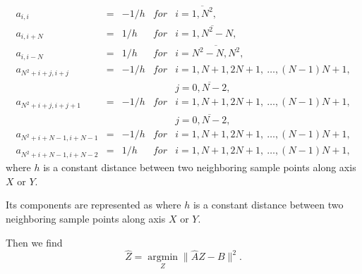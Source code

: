 \documentclass{beamer}
\begin{document}
\begin{frame}[c,allowframebreaks]
    \framebreak

    \small
    \begin{equation*}
        \begin{array}{lllll}
            a_{i,i}             & = &-1/h & for & i = \overline{1,N^2},                         \\
            a_{i,i+N}           & = &1/h  & for & i = \overline{1,N^2 - N},                     \\
            a_{i,i-N}           & = &1/h  & for & i = \overline{N^2 - N,N^2 },                  \\
            a_{N^2+i+j, i+j}    & = &-1/h & for & i = 1, N+1, 2N+1,~\dots, (N-1)N + 1,          \\
                                &   &       &   & j = \overline{0,N-2},                         \\
            a_{N^2+i+j, i+j+1}  & = &-1/h & for & i = 1, N+1, 2N+1,~\dots, (N-1)N + 1,          \\
                                &   &       &   & j = \overline{0,N-2},                         \\
            a_{N^2+i+N-1, i+N-1} &= &-1/h & for & i = 1, N+1, 2N+1,~\dots, (N-1)N + 1,          \\
            a_{N^2+i+N-1, i+N-2} &= &1/h  & for & i = 1, N+1, 2N+1,~\dots, (N-1)N + 1,
        \end{array}
    \end{equation*}
    where $h$ is a constant distance between two neighboring sample points along axis $X$ or $Y$.
    \normalsize

    \framebreak

    Its components are represented as
    where $h$ is a constant distance between two neighboring sample points along axis $X$ or $Y$.

    Then we find
    \begin{equation*}
        \hat{Z} = \operatorname{argmin}\limits_Z \|\hat{A} Z - B\|^2.
    \end{equation*}

\end{frame}

\end{document}
